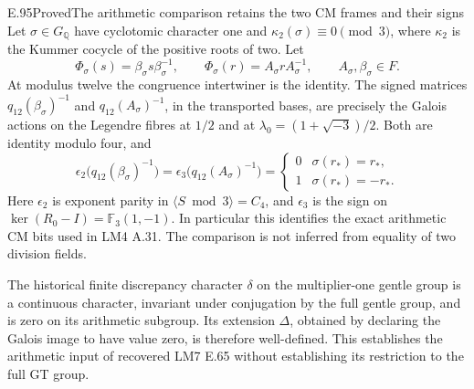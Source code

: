 \begin{result}{E.95}{Proved}{The arithmetic comparison retains the two CM frames and their signs}
Let \(\sigma\in G_{\mathbb Q}\) have cyclotomic character one and
\(\kappa_2(\sigma)\equiv0\pmod3\), where \(\kappa_2\) is the
Kummer cocycle of the positive roots of two.  Let
\[
 \Phi_\sigma(s)=\beta_\sigma s\beta_\sigma^{-1},\qquad
 \Phi_\sigma(r)=A_\sigma rA_\sigma^{-1},
 \qquad A_\sigma,\beta_\sigma\in F.
\]
At modulus twelve the congruence intertwiner is the identity.
The signed matrices \(q_{12}(\beta_\sigma)^{-1}\) and
\(q_{12}(A_\sigma)^{-1}\), in the transported bases, are precisely
the Galois actions on the Legendre fibres at \(1/2\) and at
\(\lambda_0=(1+\sqrt{-3})/2\).  Both are identity modulo four, and
\[
 \epsilon_2\bigl(q_{12}(\beta_\sigma)^{-1}\bigr)
 =\epsilon_3\bigl(q_{12}(A_\sigma)^{-1}\bigr)
 =\begin{cases}0&\sigma(r_*)=r_*,\\1&\sigma(r_*)=-r_*.\end{cases}
                                                        \tag{E.95.1}
\]
Here \(\epsilon_2\) is exponent parity in
\(\langle S\bmod3\rangle=C_4\), and \(\epsilon_3\) is the sign on
\(\ker(R_0-I)=\mathbb F_3(1,-1)\).
In particular this identifies the exact arithmetic CM bits used
in LM4 A.31.  The comparison is not inferred from equality of
two division fields.

The historical finite discrepancy character \(\delta\) on the
multiplier-one gentle group is a continuous character, invariant
under conjugation by the full gentle group, and is zero on its
arithmetic subgroup.  Its extension \(\Delta\), obtained by
declaring the Galois image to have value zero, is therefore
well-defined.  This establishes the arithmetic input of recovered
LM7 E.65 without establishing its restriction to the full GT group.
\end{result}
